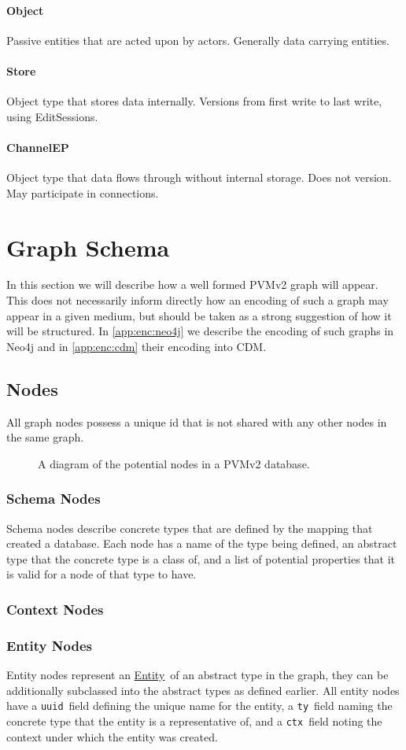 \documentclass[12pt,twoside,a4paper]{article}
\newcommand{\Entity}{\hyperref[sec:ty:entity]{Entity}}
\newcommand{\field}[1]{\texttt{#1}}
\newcommand{\para}[1]{\paragraph{#1\\}}
\begin{document}
\para{Object}
\label{sec:ty:object}
Passive entities that are acted upon by actors. Generally data carrying entities.

\para{Store}
\label{sec:ty:store}
Object type that stores data internally. Versions from first write to last write, using EditSessions.

\para{ChannelEP}
\label{sec:ty:chanep}
Object type that data flows through without internal storage. Does not version. May participate in connections.

\section{Graph Schema}
\label{sec:gs}
In this section we will describe how a well formed PVMv2 graph will appear. This does not necessarily inform directly how an encoding of such a graph may appear in a given medium, but should be taken as a strong suggestion of how it will be structured. In \autoref{app:enc:neo4j} we describe the encoding of such graphs in Neo4j and in \autoref{app:enc:cdm} their encoding into CDM.

\subsection{Nodes}
\label{sec:gs:node}
All graph nodes possess a unique id that is not shared with any other nodes in the same graph.

\begin{figure}[h]
\centering

\caption{A diagram of the potential nodes in a PVMv2 database.}
\label{fig:nodes}
\end{figure}

\subsubsection{Schema Nodes}
\label{sec:gs:node:schema}
Schema nodes describe concrete types that are defined by the mapping that created a database. Each node has a name of the type being defined, an abstract type that the concrete type is a class of, and a list of potential properties that it is valid for a node of that type to have.

\subsubsection{Context Nodes}
\label{sec:gs:node:context}

\subsubsection{Entity Nodes}
\label{sec:gs:node:entity}
Entity nodes represent an \Entity~of an abstract type in the graph, they can be additionally subclassed into the abstract types as defined earlier. All entity nodes have a \field{uuid}~field defining the unique name for the entity, a \field{ty}~field naming the concrete type that the entity is a representative of, and a \field{ctx}~field noting the context under which the entity was created.
\end{document}
